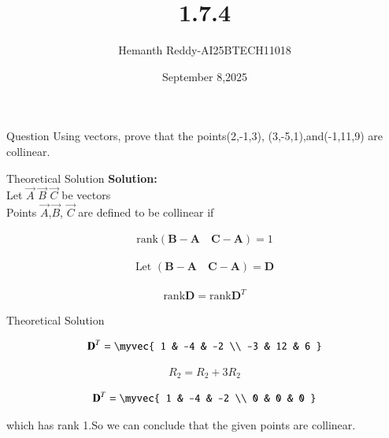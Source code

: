 \documentclass{beamer}
\title %
{1.7.4}
\date{September 8,2025}
\author %
{Hemanth Reddy-AI25BTECH11018}
\begin{document}
\frame{\titlepage}
\begin{frame}{Question}
Using vectors, prove that the points(2,-1,3), (3,-5,1),and(-1,11,9) are collinear.
\end{frame}



\begin{frame}{Theoretical Solution}
\textbf{Solution:}\\


Let $\vec{A}$   $\vec{B}$    $\vec{C}$ be vectors \\
Points $\vec{A}$,$\vec{B}$, $\vec{C}$ are defined to be collinear if\\
\begin{center}
  
        
    
  \begin{align}
\text{rank}\left(\textbf{B} - \textbf{A} \quad \textbf{C} - \textbf{A}\right) = 1
\end{align}

\begin{align}
    \text{Let }\left(\textbf{B} - \textbf{A} \quad \textbf{C} - \textbf{A}\right) = \textbf{D} 
\end{align}

\begin{align}
    \text{rank} \textbf{D} = \text{rank} \textbf{D}^{T}
\end{align}
\end{center}


\end{frame}

\begin{frame}{Theoretical Solution}

\begin{align}
    \textbf{D}^{T}=\myvec{
1 & -4 & -2 \\
-3 & 12 & 6
}
\end{align}

\begin{align}
    R_{2} = R_{2} + 3R_{2}
\end{align}

\begin{align}
    \textbf{D}^{T}=\myvec{
1 & -4 & -2 \\
0 & 0 & 0
}
\end{align}

 which has rank 1.So we can conclude that the given points are collinear.
 

\end{frame}
\end{document}
